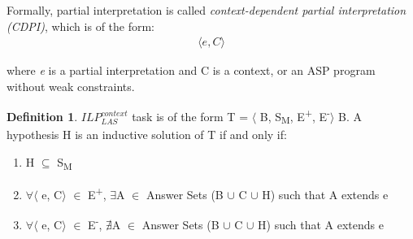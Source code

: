 \documentclass[11pt,twoside]{report}
\theoremstyle{plain}
\theoremstyle{definition}
\newtheorem{defn}[thm]{Definition} %
\begin{document}
Formally, partial interpretation is called \textit{context-dependent partial interpretation (CDPI)}, which is of the form:
\begin{equation} \label{eq:cdpi}
\begin{split}
\langle e, C \rangle
\end{split}
\end{equation}

where \textit{e} is a partial interpretation and C is a context, or an ASP program without weak constraints.


%
\begin{defn} \label{def:las_context}
$ILP_{LAS}^{context}$ task is of the form T = $\langle$ B, S\textsubscript{M}, E\textsuperscript{+}, E\textsuperscript{-}$\rangle$ B.
A hypothesis H is an inductive solution of T if and only if:
\begin{enumerate}
\item H $\subseteq$ S\textsubscript{M}
\item $\forall$$\langle$ e, C$\rangle$ $\in$ E\textsuperscript{+}, $\exists$A $\in$ Answer Sets (B $\cup$ C $\cup$ H) such that A extends e
\item $\forall$$\langle$ e, C$\rangle$ $\in$ E\textsuperscript{-}, $\nexists$A $\in$ Answer Sets (B $\cup$ C $\cup$ H) such that A extends e
\end{enumerate}
\end{defn}
\end{document}
